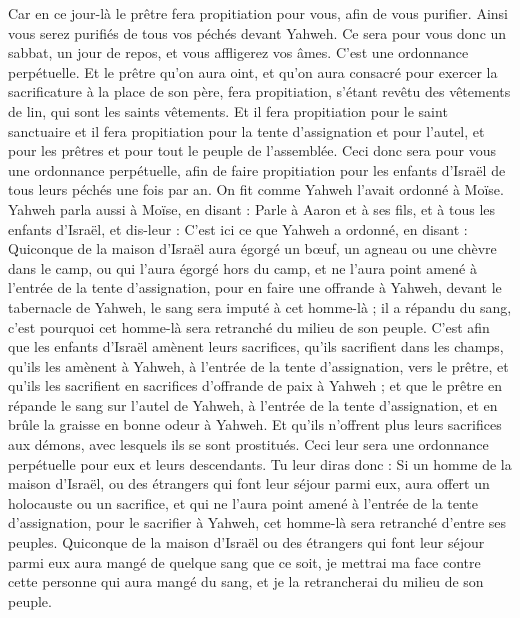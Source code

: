 \begin{multicols}{2}
Car en ce jour-là le prêtre fera propitiation pour vous, afin de vous purifier. Ainsi vous serez purifiés de tous vos péchés devant Yahweh.
Ce sera pour vous donc un sabbat, un jour de repos, et vous affligerez vos âmes. C'est une ordonnance perpétuelle.
Et le prêtre qu'on aura oint, et qu'on aura consacré pour exercer la sacrificature à la place de son père, fera propitiation, s'étant revêtu des vêtements de lin, qui sont les saints vêtements.
Et il fera propitiation pour le saint sanctuaire et il fera propitiation pour la tente d'assignation et pour l'autel, et pour les prêtres et pour tout le peuple de l'assemblée.
Ceci donc sera pour vous une ordonnance perpétuelle, afin de faire propitiation pour les enfants d'Israël de tous leurs péchés une fois par an. On fit comme Yahweh l'avait ordonné à Moïse.
\VerseOne{}Yahweh parla aussi à Moïse, en disant :
Parle à Aaron et à ses fils, et à tous les enfants d'Israël, et dis-leur : C'est ici ce que Yahweh a ordonné, en disant :
Quiconque de la maison d'Israël aura égorgé un bœuf, un agneau ou une chèvre dans le camp, ou qui l'aura égorgé hors du camp,
et ne l'aura point amené à l'entrée de la tente d'assignation, pour en faire une offrande à Yahweh, devant le tabernacle de Yahweh, le sang sera imputé à cet homme-là ; il a répandu du sang, c'est pourquoi cet homme-là sera retranché du milieu de son peuple.
C'est afin que les enfants d'Israël amènent leurs sacrifices, qu'ils sacrifient dans les champs, qu'ils les amènent à Yahweh, à l'entrée de la tente d'assignation, vers le prêtre, et qu'ils les sacrifient en sacrifices d'offrande de paix à Yahweh ;
et que le prêtre en répande le sang sur l'autel de Yahweh, à l'entrée de la tente d'assignation, et en brûle la graisse en bonne odeur à Yahweh.
Et qu'ils n'offrent plus leurs sacrifices aux démons, avec lesquels ils se sont prostitués. Ceci leur sera une ordonnance perpétuelle pour eux et leurs descendants.
Tu leur diras donc : Si un homme de la maison d'Israël, ou des étrangers qui font leur séjour parmi eux, aura offert un holocauste ou un sacrifice,
et qui ne l'aura point amené à l'entrée de la tente d'assignation, pour le sacrifier à Yahweh, cet homme-là sera retranché d'entre ses peuples.
Quiconque de la maison d'Israël ou des étrangers qui font leur séjour parmi eux aura mangé de quelque sang que ce soit, je mettrai ma face contre cette personne qui aura mangé du sang, et je la retrancherai du milieu de son peuple.

\end{multicols}
